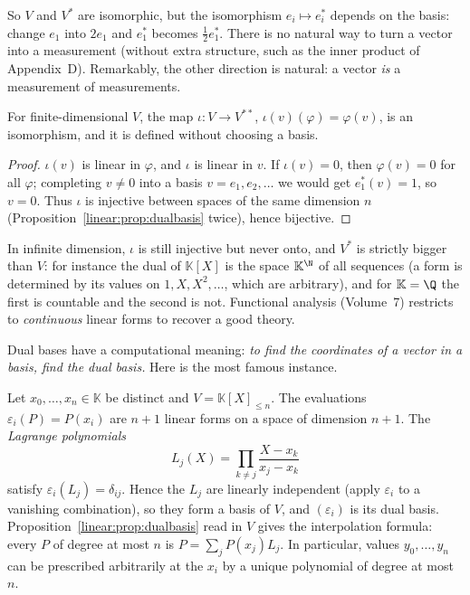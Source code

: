 So $V$ and $V^*$ are isomorphic, but the isomorphism $e_i\mapsto e_i^*$ depends on the basis: change $e_1$ into $2e_1$
and $e_1^*$ becomes $\tfrac12e_1^*$. There is no natural way to turn a vector into a measurement (without extra
structure, such as the inner product of Appendix~D). Remarkably, the other direction is natural: a vector \emph{is} a
measurement of measurements.

\begin{theorem}\label{linear:thm:bidual}
For finite-dimensional $V$, the map $\iota:V\to V^{**}$, $\iota(v)(\varphi)=\varphi(v)$, is an isomorphism, and it is
defined without choosing a basis.
\end{theorem}
\begin{proof}
$\iota(v)$ is linear in $\varphi$, and $\iota$ is linear in $v$. If $\iota(v)=0$, then $\varphi(v)=0$ for all
$\varphi$; completing $v\ne0$ into a basis $v=e_1,e_2,\dots$ we would get $e_1^*(v)=1$, so $v=0$. Thus $\iota$ is
injective between spaces of the same dimension $n$ (Proposition~\ref{linear:prop:dualbasis} twice), hence bijective.
\end{proof}

\begin{remark}
In infinite dimension, $\iota$ is still injective but never onto, and $V^*$ is strictly bigger than $V$: for instance the
dual of $\mathbb K[X]$ is the space $\mathbb K^{\N}$ of all sequences (a form is determined by its values on
$1,X,X^2,\dots$, which are arbitrary), and for $\mathbb K=\Q$ the first is countable and the second is not. Functional
analysis (Volume~7) restricts to \emph{continuous} linear forms to recover a good theory.
\end{remark}

Dual bases have a computational meaning: \emph{to find the coordinates of a vector in a basis, find the dual basis.}
Here is the most famous instance.

\begin{example}\label{linear:ex:lagrange}
Let $x_0,\dots,x_n\in\mathbb K$ be distinct and $V=\mathbb K[X]_{\le n}$. The evaluations $\varepsilon_i(P)=P(x_i)$ are
$n+1$ linear forms on a space of dimension $n+1$. The \emph{Lagrange polynomials}
\[
L_j(X)=\prod_{k\ne j}\frac{X-x_k}{x_j-x_k}
\]
satisfy $\varepsilon_i(L_j)=\delta_{ij}$. Hence the $L_j$ are linearly independent (apply $\varepsilon_i$ to a vanishing
combination), so they form a basis of $V$, and $(\varepsilon_i)$ is its dual basis. Proposition~\ref{linear:prop:dualbasis}
read in $V$ gives the interpolation formula: every $P$ of degree at most $n$ is $P=\sum_jP(x_j)L_j$. In particular,
values $y_0,\dots,y_n$ can be prescribed arbitrarily at the $x_i$ by a unique polynomial of degree at most $n$.
\end{example}

